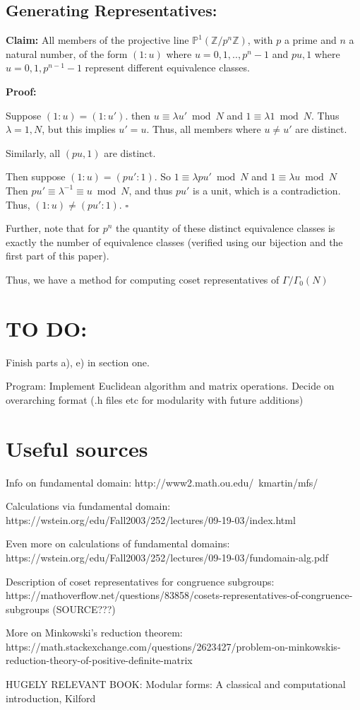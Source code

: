 \documentclass[11pt, oneside]{article}   	%
\begin{document}
\subsection*{Generating Representatives:}

\textbf{Claim: } All members of the projective line $\mathbb{P}^1(\mathbb{Z}/p^n\mathbb{Z})$, with $p$ a prime and $n$ a natural number, of the form $(1:u)$ where $u=0,1,..,p^{n}-1$ and $pu, 1$ where $u=0,1,p^{n-1}-1$ represent different equivalence classes.

\textbf{Proof:}

Suppose $(1:u)=(1:u')$. then $u\equiv\lambda u' \bmod{N}$ and $1\equiv\lambda 1 \bmod{N}$. Thus $\lambda=1,N$, but this implies $u'=u$. Thus, all members where $u\neq u'$ are distinct.

Similarly, all $(pu, 1)$ are distinct.

Then suppose $(1:u)=(pu':1)$. So $1\equiv \lambda pu' \bmod{N}$ and $1\equiv \lambda u \bmod{N}$ Then $pu'\equiv \lambda^{-1} \equiv u \bmod{N}$, and thus $pu'$ is a unit, which is a contradiction. Thus, $(1:u)\neq(pu':1)$. $\square$

Further, note that for $p^n$ the quantity of these distinct equivalence classes is exactly the number of equivalence classes (verified using our bijection and the first part of this paper).

Thus, we have a method for computing coset representatives of $\Gamma/\Gamma_0 (N)$


\section*{TO DO:}

Finish parts a), e) in section one.

Program: Implement Euclidean algorithm and matrix operations. Decide on overarching format (.h files etc for modularity with future additions)

\section*{Useful sources}

Info on fundamental domain: http://www2.math.ou.edu/~kmartin/mfs/

Calculations via fundamental domain: https://wstein.org/edu/Fall2003/252/lectures/09-19-03/index.html

Even more on calculations of fundamental domains: https://wstein.org/edu/Fall2003/252/lectures/09-19-03/fundomain-alg.pdf

Description of coset representatives for congruence subgroups: https://mathoverflow.net/questions/83858/cosets-representatives-of-congruence-subgroups (SOURCE???)

More on Minkowski's reduction theorem: https://math.stackexchange.com/questions/2623427/problem-on-minkowskis-reduction-theory-of-positive-definite-matrix

HUGELY RELEVANT BOOK: Modular forms: A classical and computational introduction, Kilford
\end{document}
